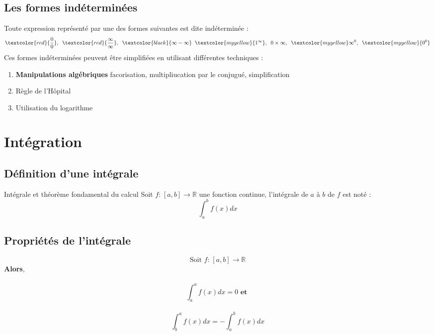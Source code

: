 \documentclass{report}
\newcommand{\varitem}[3][black]{%
    \item[%
        \colorbox{#2}{\textcolor{#1}{\makebox(5.5,7){#3}}}%
    ]
}
\begin{document}
\begin{multicols*}{3}
\section{Les formes indéterminées}
Toute expression représenté par une des formes suivantes est dite \textcolor{myb}{indéterminée} :
\begin{align*}
  \textcolor{red}{\dfrac{0}{0}}, \;\; \textcolor{red}{\dfrac{\infty}{\infty}}, \;\; 
  \textcolor{black}{\infty - \infty} \;\; \textcolor{myyellow}{1^{\infty}}, \;\; 
  0 \times \infty, \;\; \textcolor{myyellow}\infty^{0}, \;\; \textcolor{myyellow}{0^0}   
\end{align*}
Ces formes indéterminées peuvent être simplifiées en utilisant différentes techniques :
\begin{enumerate}
  \varitem{black}{} \textbf{Manipulations algébriques} facorisation, multipliucation par le conjugué, simplification
  \varitem{red}{} Règle de l'Hôpital 
  \varitem{myyellow}{} Utilisation du logarithme
\end{enumerate}

\chapter{Intégration}
\section{Définition d'une intégrale}

\begin{Concept}{Intégrale et théorème fondamental du calcul}{}
  Soit $f \text{:} \; [a,b] \rightarrow \mathbb{R} $ une fonction continue, \textcolor{myb}{l'intégrale} 
  de $a$ à $b$ de $f$ est noté :  
  \[ \int_{a}^{b}f(x)dx \]
\end{Concept}

\columnbreak


\section{Propriétés de l'intégrale}

\begin{Concept}{}{}

$$\text{Soit } f\text{:} \; [a,b] \rightarrow \mathbb{R}$$ \textbf{Alors}, \\\\
$$\int_{a}^{a}f(x)dx = 0 \textbf{ et }$$
\\
$$\int_{b}^{a}f(x)dx = - \int_{a}^{b}f(x)dx$$



\end{Concept}
\end{multicols*}
\end{document}
